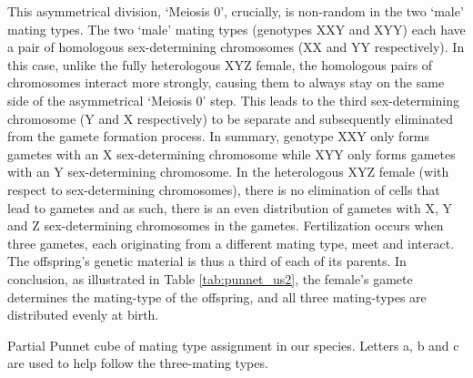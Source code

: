 This asymmetrical division, `Meiosis 0', crucially, is non-random in the two `male' mating types. The two `male' mating types (genotypes XXY and XYY) each have a pair of homologous sex-determining chromosomes (XX and YY respectively). In this case, unlike the fully heterologous XYZ female, the homologous pairs of chromosomes interact more strongly, causing them to always stay on the same side of the asymmetrical `Meiosis 0' step. This leads to the third sex-determining chromosome (Y and X respectively) to be separate and subsequently eliminated from the gamete formation process. In summary, genotype XXY only forms gametes with an X sex-determining chromosome while XYY only forms gametes with an Y sex-determining chromosome. In the heterologous XYZ female (with respect to sex-determining chromosomes), there is no elimination of cells that lead to gametes and as such, there is an even distribution of gametes with X, Y and Z sex-determining chromosomes in the gametes. Fertilization occurs when three gametes, each originating from a different mating type, meet and interact. The offspring's genetic material is thus a third of each of its parents. In conclusion, as illustrated in Table \ref{tab:punnet_us2}, the female's gamete determines the mating-type of the offspring, and all three mating-types are distributed evenly at birth.


\begin{table}
\centering
{}
\caption{Partial Punnet cube of mating type assignment in our species. Letters a, b and c are used to help follow the three-mating types.} 
\label{tab:punnet_us2}
\end{table}




